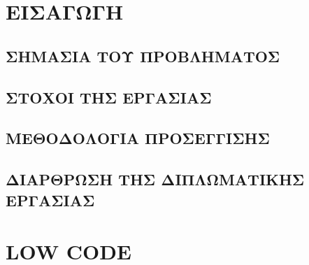 \documentclass{template}
\begin{document}
	
	\mainmatter

    \chapter{ΕΙΣΑΓΩΓΗ}

        \section{ΣΗΜΑΣΙΑ ΤΟΥ ΠΡΟΒΛΗΜΑΤΟΣ}
        \section{ΣΤΟΧΟΙ ΤΗΣ ΕΡΓΑΣΙΑΣ}
        \section{ΜΕΘΟΔΟΛΟΓΙΑ ΠΡΟΣΕΓΓΙΣΗΣ}
        \section{ΔΙΑΡΘΡΩΣΗ ΤΗΣ ΔΙΠΛΩΜΑΤΙΚΗΣ ΕΡΓΑΣΙΑΣ}

    \chapter{LOW CODE}




\end{document}
